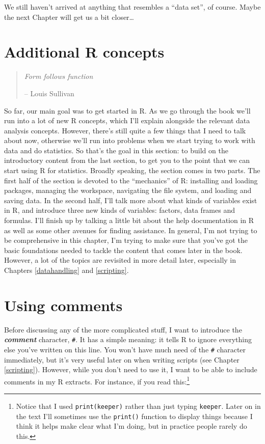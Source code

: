 \documentclass[
]{book}
\begin{document}
We still haven't arrived at anything that resembles a ``data set'', of course. Maybe the next Chapter will get us a bit closer\ldots{}

\hypertarget{mechanics}{%
\section{Additional R concepts}\label{mechanics}}

\begin{quote}
\emph{Form follows function}

-- Louis Sullivan
\end{quote}

So far, our main goal was to get started in R. As we go through the book we'll run into a lot of new R concepts, which I'll explain alongside the relevant data analysis concepts. However, there's still quite a few things that I need to talk about now, otherwise we'll run into problems when we start trying to work with data and do statistics. So that's the goal in this section: to build on the introductory content from the last section, to get you to the point that we can start using R for statistics. Broadly speaking, the section comes in two parts. The first half of the section is devoted to the ``mechanics'' of R: installing and loading packages, managing the workspace, navigating the file system, and loading and saving data. In the second half, I'll talk more about what kinds of variables exist in R, and introduce three new kinds of variables: factors, data frames and formulas. I'll finish up by talking a little bit about the help documentation in R as well as some other avenues for finding assistance. In general, I'm not trying to be comprehensive in this chapter, I'm trying to make sure that you've got the basic foundations needed to tackle the content that comes later in the book. However, a lot of the topics are revisited in more detail later, especially in Chapters \ref{datahandling} and \ref{scripting}.

\hypertarget{comments}{%
\section{Using comments}\label{comments}}

Before discussing any of the more complicated stuff, I want to introduce the \textbf{\emph{comment}} character, \texttt{\#}. It has a simple meaning: it tells R to ignore everything else you've written on this line. You won't have much need of the \texttt{\#} character immediately, but it's very useful later on when writing scripts (see Chapter \ref{scripting}). However, while you don't need to use it, I want to be able to include comments in my R extracts. For instance, if you read this:\footnote{Notice that I used \texttt{print(keeper)} rather than just typing \texttt{keeper}. Later on in the text I'll sometimes use the \texttt{print()} function to display things because I think it helps make clear what I'm doing, but in practice people rarely do this.}
\end{document}
